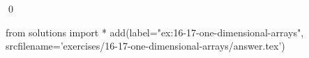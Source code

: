 
\begin{ex}
  \label{ex:16-17-one-dimensional-arrays}
  
  \qed
\end{ex}
\begin{python0}
from solutions import *
add(label="ex:16-17-one-dimensional-arrays",
    srcfilename='exercises/16-17-one-dimensional-arrays/answer.tex')
\end{python0}
